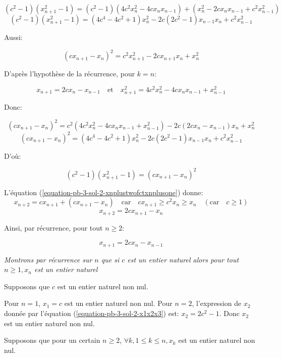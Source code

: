 \documentclass[12pt,a4paper,article]{memoir}
\begin{document}
\[(c^2 - 1)(x_{n+1}^2 - 1) = (c^{2} - 1)(4c^{2}x_{n}^{2} - 4cx_{n}x_{n-1}) + (x_{n}^{2} - 2c x_{n}x_{n-1} + c^{2}x_{n-1}^{2}) \]
\[(c^2 - 1)(x_{n+1}^2 - 1) = (4c^{4} - 4c^{2} + 1)x_{n}^{2} - 2c(2c^{2} - 1)x_{n-1}x_{n} + c^{2}x_{n-1}^{2} \]

Aussi:

\[(cx_{n+1} - x_{n})^{2} = c^{2}x_{n+1}^{2} - 2cx_{n+1}x_{n} + x_{n}^{2} \]

D'après l'hypothèse de la récurrence, pour $k=n$:

\[x_{n+1} = 2cx_{n} - x_{n-1} \quad \textrm{et} \quad x_{n+1}^2 = 4c^{2}x_{n}^{2} - 4cx_{n}x_{n-1} + x_{n-1}^{2} \]

Donc:

\[(cx_{n+1} - x_{n})^{2} = c^{2}(4c^{2}x_{n}^{2} - 4cx_{n}x_{n-1} + x_{n-1}^{2}) - 2c(2cx_{n} - x_{n-1})x_{n} + x_{n}^{2} \]
\[(cx_{n+1} - x_{n})^{2} = (4c^{4} - 4c^{2} + 1)x_{n}^{2} - 2c(2c^{2} - 1)x_{n-1}x_{n} + c^{2}x_{n-1}^{2} \]

D'où:

\[(c^2 - 1)(x_{n+1}^2 - 1) = (cx_{n+1} - x_{n})^{2}\]

L'équation (\ref{equation-pb-3-sol-2-xnplustwofctxnplusone}) donne:
\[x_{n+2} = cx_{n+1} + (cx_{n+1} - x_{n}) \quad \textrm{car} \quad cx_{n+1} \geq c^{2}x_{n} \geq x_{n} \quad (\textrm{car} \quad c \geq 1)\]
\[x_{n+2} = 2cx_{n+1} - x_{n}\]

Ainsi, par récurrence, pour tout $n \geq 2$: 

\begin{equation}
x_{n+1} = 2cx_{n} - x_{n-1}
\label{equation-pb-3-sol-2-xnplusonefct-xn-xnminusone}
\end{equation}

\bigskip

\textit{Montrons par récurrence sur $n$ que si $c$ est un entier naturel alors pour tout $n \geq 1, x_{n}$ est un entier naturel}

\bigskip

Supposons que $c$ est un entier naturel non nul.

\bigskip

Pour $n = 1$, $x_{1} = c$ est un entier naturel non nul. Pour $n=2$, l'expression de $x_{2}$ donnée par l'équation (\ref{equation-pb-3-sol-2-x1x2x3}) est: $x_{2}=2c^{2} - 1$. Donc $x_{2}$ est un entier naturel non nul.

Supposons que pour un certain $n \geq 2$, $\forall k, 1 \leq k \leq n, x_{k}$ est un entier naturel non nul. 

\bigskip
\end{document}
